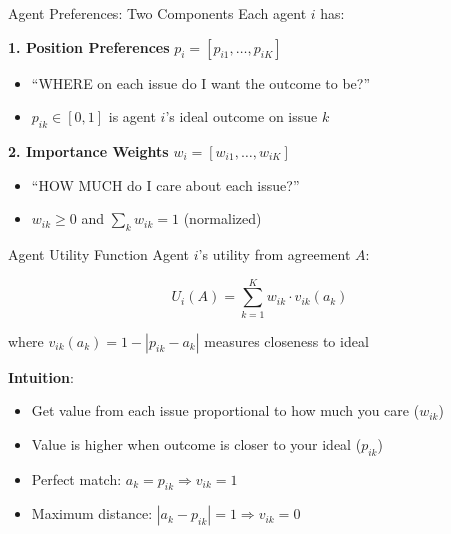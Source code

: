 \documentclass{beamer}
\begin{document}
\begin{frame}{Agent Preferences: Two Components}
Each agent $i$ has:

\vspace{0.2cm}

\textbf{1. Position Preferences} $p_i = [p_{i1}, \ldots, p_{iK}]$
\begin{itemize}
    \item ``WHERE on each issue do I want the outcome to be?''
    \item $p_{ik} \in [0,1]$ is agent $i$'s ideal outcome on issue $k$
\end{itemize}

\vspace{0.3cm}

\textbf{2. Importance Weights} $w_i = [w_{i1}, \ldots, w_{iK}]$
\begin{itemize}
    \item ``HOW MUCH do I care about each issue?''
    \item $w_{ik} \geq 0$ and $\sum_k w_{ik} = 1$ (normalized)
\end{itemize}
\end{frame}

\begin{frame}{Agent Utility Function}
Agent $i$'s utility from agreement $A$:

\begin{equation*}
U_i(A) = \sum_{k=1}^{K} w_{ik} \cdot v_{ik}(a_k)
\end{equation*}

\vspace{0.3cm}

where $v_{ik}(a_k) = 1 - |p_{ik} - a_k|$ measures closeness to ideal

\vspace{0.5cm}

\textbf{Intuition}:
\begin{itemize}
    \item Get value from each issue proportional to how much you care ($w_{ik}$)
    \item Value is higher when outcome is closer to your ideal ($p_{ik}$)
    \item Perfect match: $a_k = p_{ik} \Rightarrow v_{ik} = 1$
    \item Maximum distance: $|a_k - p_{ik}| = 1 \Rightarrow v_{ik} = 0$
\end{itemize}
\end{frame}
\end{document}
